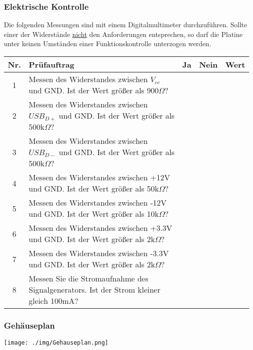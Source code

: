\subsubsection*{Elektrische Kontrolle}
Die folgenden Messungen sind mit einem Digitalmultimeter durchzuführen. Sollte einer der Widerstände \underline{nicht} den Anforderungen entsprechen, so darf die Platine unter keinen Umständen einer Funktionskontrolle unterzogen werden.
\begin{flushleft}
	\begin{tabular}{|c||p{10cm}|c|c|p{2cm}|}
		\hline
		Nr. & Prüfauftrag & Ja & Nein & Wert\\
		\hline
		1 & Messen des Widerstandes zwischen $V_{cc}$ und GND. Ist der Wert größer als 900$\Omega$? & & &\\
		\hline
		2 & Messen des Widerstandes zwischen $USB_{D+}$ und GND. Ist der Wert größer als 500k$\Omega$? & & & \\
		\hline
		3 & Messen des Widerstandes zwischen $USB_{D-}$ und GND. Ist der Wert größer als 500k$\Omega$? & & & \\
		\hline
		4 & Messen des Widerstandes zwischen +12V und GND. Ist der Wert größer als 50k$\Omega$? & & & \\
		\hline
		5 & Messen des Widerstandes zwischen -12V und GND. Ist der Wert größer als 10k$\Omega$? &&& \\
		\hline
		6 & Messen des Widerstandes zwischen +3.3V und GND. Ist der Wert größer als 2k$\Omega$? &&& \\
		\hline
		7 & Messen des Widerstandes zwischen -3.3V und GND. Ist der Wert größer als 2k$\Omega$? &&& \\
		\hline
		8 & Messen Sie die Stromaufnahme des Signalgenerators. Ist der Strom kleiner gleich 100mA? &&& \\
		\hline
	\end{tabular}
\end{flushleft}

\subsubsection{Gehäuseplan}
\texttt{[image: ./img/Gehauseplan.png]}